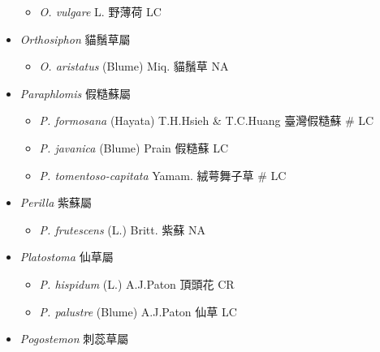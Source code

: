 \begin{itemize}
  \begin{itemize}
        \item[] \textit{O. vulgare} L.  野薄荷   LC
  \end{itemize}
 \item[] \textit{Orthosiphon} 貓鬚草屬
                                
  \begin{itemize}
        \item[] \textit{O. aristatus} (Blume) Miq.  貓鬚草   NA
  \end{itemize}
 \item[] \textit{Paraphlomis} 假糙蘇屬
                                
  \begin{itemize}
        \item[] \textit{P. formosana} (Hayata) T.H.Hsieh \& T.C.Huang  臺灣假糙蘇  \# LC
        \item[] \textit{P. javanica} (Blume) Prain  假糙蘇   LC
        \item[] \textit{P. tomentoso-capitata} Yamam.  絨萼舞子草  \# LC
  \end{itemize}
 \item[] \textit{Perilla} 紫蘇屬
                                
  \begin{itemize}
        \item[] \textit{P. frutescens} (L.) Britt.  紫蘇   NA
  \end{itemize}
 \item[] \textit{Platostoma} 仙草屬
                                
  \begin{itemize}
        \item[] \textit{P. hispidum} (L.) A.J.Paton  頂頭花   CR
        \item[] \textit{P. palustre} (Blume) A.J.Paton  仙草   LC
  \end{itemize}
 \item[] \textit{Pogostemon} 刺蕊草屬
                                

\end{itemize}
